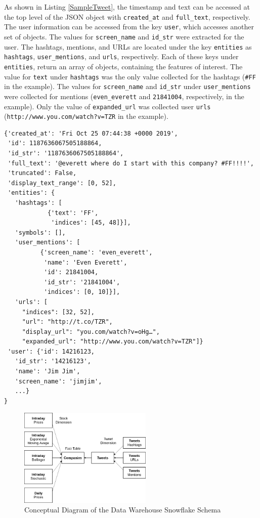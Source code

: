 \documentclass[journal]{IEEEtran}
\begin{document}
As shown in Listing \ref{SampleTweet}, the timestamp and text
 can be accessed at the top level of the JSON object with \texttt{created\_at} and
 \texttt{full\_text}, respectively. 
The user information can be accessed from the key \texttt{user}, 
 which accesses another set of objects. 
The values for \texttt{screen\_name} and \texttt{id\_str} were extracted for the user.
The hashtags, mentions, and URLs are located under the key \texttt{entities} as
 \texttt{hashtags}, \texttt{user\_mentions}, and \texttt{urls}, respectively.
Each of these keys under \texttt{entities}, return an array of objects,
 containing the features of interest. 
The value for \texttt{text} under \texttt{hashtags} was the only value collected
 for the hashtags (\texttt{\#FF} in the example).
The values for \texttt{screen\_name} and \texttt{id\_str} under 
 \texttt{user\_mentions} were collected for mentions (\texttt{even\_everett} and
 \texttt{21841004}, respectively, in the example).
Only the value of \texttt{expanded\_url} was collected user \texttt{urls}
 (\texttt{http://www.you.com/watch?v=TZR} in the example).


\begin{lstlisting}[frame=single,
 caption={Sample Tweet JSON},
 label={SampleTweet}]
{'created_at': 'Fri Oct 25 07:44:38 +0000 2019',
 'id': 1187636067505188864,
 'id_str': '1187636067505188864',
 'full_text': '@everett where do I start with this company? #FF!!!!',
 'truncated': False,
 'display_text_range': [0, 52],
 'entities': {
   'hashtags': [
            {'text': 'FF',
             'indices': [45, 48]}],
   'symbols': [],
   'user_mentions': [
          {'screen_name': 'even_everett',
           'name': 'Even Everett',
           'id': 21841004,
           'id_str': '21841004',
           'indices': [0, 10]}],
   'urls': [
     "indices": [32, 52],
     "url": "http://t.co/TZR",
     "display_url": "you.com/watch?v=oHg…",
     "expanded_url": "http://www.you.com/watch?v=TZR"]}
 'user': {'id': 14216123,
   'id_str': '14216123',
   'name': 'Jim Jim',
   'screen_name': 'jimjim',
   ...}
}
\end{lstlisting}

\begin{figure}
	\centering
	\includegraphics[width=2.5in]{SnowFlake_Schema_Simple.png}
	\caption{Conceptual Diagram of the Data Warehouse Snowflake Schema}
	\label{snowflake}
\end{figure}
\end{document}
